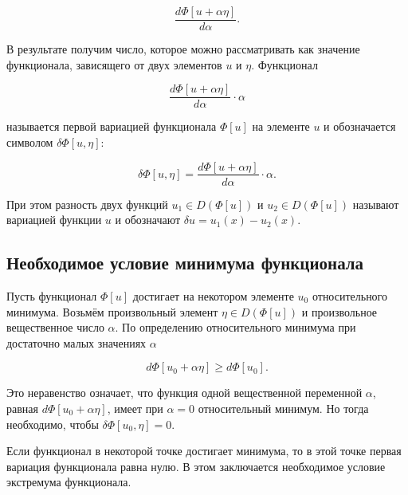 \documentclass{article}
\begin{document}
\begin{displaymath}
    \frac{d\Phi[u + \alpha \eta]}{d\alpha}.
\end{displaymath}

\noindent В результате получим число, которое можно рассматривать как значение функционала, зависящего от двух элементов $u$ и $\eta$. Функционал

\begin{displaymath}
    \frac{d\Phi[u + \alpha \eta]}{d\alpha} \cdot \alpha
\end{displaymath}

\noindent называется первой вариацией функционала $\Phi[u]$ на элементе $u$ и обозначается символом $\delta \Phi[u, \eta]$:

\begin{displaymath}
     \delta \Phi[u, \eta] = \frac{d\Phi[u + \alpha \eta]}{d\alpha} \cdot \alpha.
\end{displaymath}

\noindent При этом разность двух функций $u_{1} \in D(\Phi[u])$ и $u_{2} \in D(\Phi[u])$ называют вариацией функции $u$ и обозначают $\delta u = u_{1}(x) - u_{2}(x)$.


\subsection{Необходимое условие минимума функционала}\label{sub_section_minimum_conditions}

Пусть функционал $\Phi[u]$ достигает на некотором элементе $u_{0}$ относительного минимума. Возьмём произвольный элемент $\eta \in D(\Phi[u])$ и произвольное вещественное число $\alpha$. По определению относительного минимума при достаточно малых значениях $\alpha$

\begin{displaymath}
     d\Phi[u_{0} + \alpha\eta] \geq d\Phi[u_{0}].
\end{displaymath}

\noindent Это неравенство означает, что функция одной вещественной переменной $\alpha$, равная $d\Phi[u_{0} + \alpha\eta]$, имеет при $\alpha = 0$ относительный минимум. Но тогда необходимо, чтобы  $\delta \Phi[u_{0}, \eta] = 0$.

\begin{warn}[Важно!]
	Если функционал в некоторой точке достигает минимума, то в этой точке первая вариация функционала равна нулю. В этом заключается необходимое условие экстремума функционала.
\end{warn}
\end{document}
